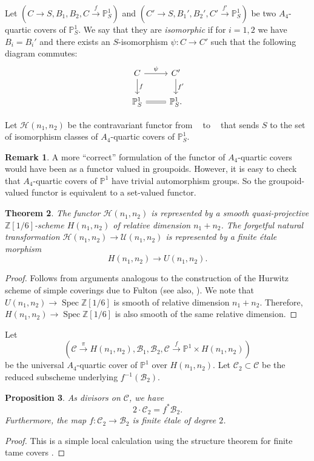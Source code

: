 \documentclass{amsart}
\numberwithin{equation}{section} \numberwithin{figure}{section}
\DeclareMathOperator{\Spec}{Spec}
\DeclareMathOperator{\Schemes}{\underline{Schemes}}
\DeclareMathOperator{\Sets}{\underline{Sets}}
\newcommand\PP{\mathbb{P}}
\newcommand\ZZ{\mathbb{Z}}
\newcommand{\cH}{\mathcal{H}}
\newcommand{\cU}{\mathcal{U}}
\theoremstyle{one}
\newtheorem{theorem}{\textbf{Theorem}}[section]
\newtheorem{proposition}[theorem]{\textbf{Proposition}}
\theoremstyle{definition}
\newtheorem{remark}[theorem]{Remark}
\begin{document}
Let \((C \to S, B_1, B_2, C \xrightarrow{f} \PP^1_S)\) and \((C' \to S, B_1', B_2', C' \xrightarrow{f'} \PP^1_S)\) be two \(A_4\)-quartic covers of \(\PP^1_S\).
We say that they are \emph{isomorphic} if for \(i = 1,2\) we have \(B_i = B_i'\) and there exists an \(S\)-isomorphism \(\psi \colon C \to C'\) such that the following diagram commutes:
\[
  \begin{tikzcd}
    C \ar{r}{\psi}\ar{d}{f}& C' \ar{d}{f'}\\
    \PP^1_S \ar[equal]{r}& \PP^1_{S}.
  \end{tikzcd}
\]

Let \(\cH(n_1,n_2)\) be the contravariant functor from \(\Schemes\) to \(\Sets\) that sends \(S\) to the set of isomorphism classes of \(A_4\)-quartic covers of \(\PP^1_S\). 
\begin{remark}
  A more ``correct'' formulation of the functor of \(A_4\)-quartic covers would have been as a functor valued in groupoids.
  However, it is easy to check that \(A_4\)-quartic covers of \(\PP^1\) have trivial automorphism groups.
  So the  groupoid-valued functor is equivalent to a set-valued functor.
\end{remark}

\begin{theorem}\label{thm:HoverU}
  The functor \(\cH(n_1,n_2)\) is represented by a smooth quasi-projective \(\ZZ[1/6]\)-scheme \(H(n_1,n_2)\) of relative dimension $n_1+n_2$. The forgetful natural transformation \(\cH(n_1,n_2) \to \cU(n_1,n_2)\) is represented by a finite \'etale morphism
  \[ H(n_1,n_2) \to U(n_1,n_2).\]
\end{theorem}
\begin{proof}
  Follows from arguments analogous to the construction of the Hurwitz scheme of simple coverings due to Fulton \cite[\S~6]{ful:69} (see also, \cite[\S~4]{wew:98}).
  We note that \(U(n_1,n_2) \to \Spec \ZZ[1/6]\) is smooth of relative dimension \(n_1+n_2\).
  Therefore, \(H(n_1,n_2) \to \Spec \ZZ[1/6]\) is also smooth of the same relative dimension.
\end{proof}


Let \[(\mathcal{C} \xrightarrow{\pi} H(n_1,n_2), \mathcal{B}_1, \mathcal{B}_2, \mathcal{C} \xrightarrow{f} \PP^1 \times H(n_1,n_2))\] be the universal \(A_4\)-quartic cover of \(\PP^1\) over \({H(n_1,n_2)}\).
Let \( {\mathcal C}_2 \subset \mathcal{C}\) be the reduced subscheme underlying \(f^{-1}(\mathcal{B}_2)\).
\begin{proposition}
  As divisors on \(\mathcal{C}\), we have
  \[ 2  \cdot {\mathcal C}_2 = f^{*} \mathcal B_2.\]
  Furthermore, the map \(f \colon {\mathcal C}_2 \to \mathcal{B}_2\) is finite \'etale of degree \(2\).
\end{proposition}
\begin{proof}
  This is a simple local calculation using the structure theorem for finite tame covers \cite[\S~4]{ful:69}.
\end{proof}
\end{document}
